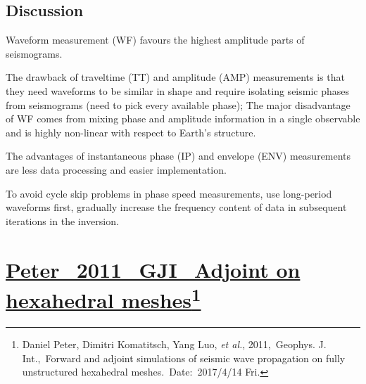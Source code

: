 \documentclass{article}
\newcommand{\Ppath}{/home/tche/Learning/Learning/Paper/}
\newcommand{\prf}{This is relative path from \Papth to the paper file}
\newcommand{\pmk}{This is the brief info.}
\newcommand{\pti}{This is the paper tile}
\newcommand{\pay}{These are authors and year}
\newcommand{\pjo}{This is the journal}
\newcommand{\pda}{This is the date}
\newcommand{\refp}[1]{\href{run:\Ppath\prf}{#1}}
\newcommand{\pinfo}{\refp{\pmk}\footnote{\pay,~\pjo,~\pti.~Date:~\pda}}
\newcommand{\etal}{\textit{et al.}}
\begin{document}
\subsection{Discussion}
Waveform measurement (WF) favours the highest amplitude parts of seismograms.\par
The drawback of traveltime (TT) and amplitude (AMP) measurements is that they need waveforms to be similar in shape and require isolating seismic phases from seismograms (need to pick every available phase); The major disadvantage of WF comes from mixing phase and amplitude information in a single observable and is highly non-linear with respect to Earth's structure.\par
The advantages of instantaneous phase (IP) and envelope (ENV) measurements are less data processing and easier implementation.\par
To avoid cycle skip problems in phase speed measurements, use long-period waveforms first, gradually increase the frequency content of data in subsequent iterations in the inversion.\par
\vspace{5mm}

\renewcommand{\pmk}{Peter\_2011\_GJI\_Adjoint on hexahedral meshes}
\renewcommand{\prf}{FWI/\pmk.pdf}
\renewcommand{\pti}{Forward and adjoint simulations of seismic wave propagation on fully unstructured hexahedral meshes}
\renewcommand{\pay}{Daniel Peter, Dimitri Komatitsch, Yang Luo, \etal, 2011}
\renewcommand{\pjo}{Geophys. J. Int.}
\renewcommand{\pda}{2017/4/14 Fri.}
\section{\pinfo}
\end{document}
